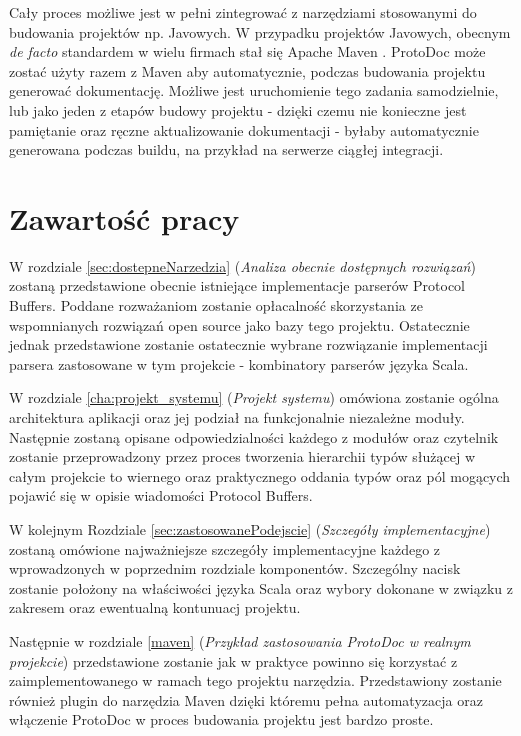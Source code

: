 \documentclass[pdflatex,11pt]{aghdpl}
\begin{document}
Cały proces możliwe jest w pełni zintegrować z narzędziami stosowanymi do budowania projektów np. Javowych. W przypadku projektów Javowych, obecnym \textit{de facto}
standardem w wielu firmach stał się Apache Maven \cite{Maven}.
ProtoDoc może zostać użyty razem z Maven aby automatycznie, podczas budowania projektu generować
dokumentację. Możliwe jest uruchomienie tego zadania samodzielnie, lub jako jeden z etapów budowy projektu - dzięki czemu nie konieczne jest pamiętanie oraz ręczne
aktualizowanie dokumentacji - byłaby automatycznie generowana podczas buildu, na przykład na serwerze ciągłej integracji.

\section{Zawartość pracy}
W rozdziale \ref{sec:dostepneNarzedzia} (\textit{Analiza obecnie dostępnych rozwiązań}) zostaną przedstawione obecnie istniejące implementacje parserów Protocol Buffers.
Poddane rozważaniom zostanie opłacalność skorzystania ze wspomnianych rozwiązań open source jako bazy tego projektu.
Ostatecznie jednak przedstawione zostanie ostatecznie wybrane rozwiązanie implementacji parsera zastosowane w tym projekcie - kombinatory parserów języka Scala.

W rozdziale \ref{cha:projekt_systemu} (\textit{Projekt systemu}) omówiona zostanie ogólna architektura aplikacji oraz jej podział na funkcjonalnie niezależne moduły.
Następnie zostaną opisane odpowiedzialności każdego z modułów oraz czytelnik zostanie przeprowadzony przez proces tworzenia hierarchii typów
służącej w całym projekcie to wiernego oraz praktycznego oddania typów oraz pól mogących pojawić się w opisie wiadomości Protocol Buffers.

W kolejnym Rozdziale \ref{sec:zastosowanePodejscie} (\textit{Szczegóły implementacyjne}) zostaną omówione najważniejsze szczegóły implementacyjne każdego z wprowadzonych w poprzednim rozdziale komponentów.
Szczególny nacisk zostanie położony na właściwości języka Scala oraz wybory dokonane w związku z zakresem oraz ewentualną kontunuacj projektu.

Następnie w rozdziale \ref{maven} (\textit{Przykład zastosowania ProtoDoc w realnym projekcie}) przedstawione zostanie jak w praktyce
powinno się korzystać z zaimplementowanego w ramach tego projektu narzędzia. Przedstawiony zostanie również plugin do narzędzia Maven \cite{Maven}
dzięki któremu pełna automatyzacja oraz włączenie ProtoDoc w proces budowania projektu jest bardzo proste.
\end{document}
